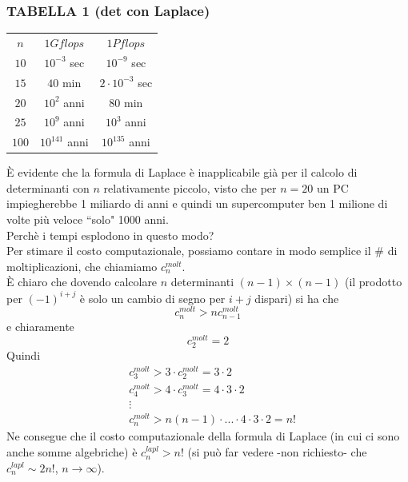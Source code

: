 \documentclass[12pt,a4paper]{article}
\begin{document}
\subsubsection{TABELLA 1 (det con Laplace)}
\begin{table}[H]
    \centering
    \begin{tabular}{ccc}
        $n$ & $1 Gflops$ & $1 Pflops$  \\  \cline{1-3}
        $10$ & $10^{-3}$ sec & $10^{-9}$ sec \\
        $15$ & $40$ min & $2\cdot10^{-3}$ sec \\
	    $20$ & $10^{2}$ anni & $80$ min \\
    	$25$ & $10^{9}$ anni & $10^{3}$ anni \\
    	$100$ & $10^{141}$ anni & $10^{135}$ anni\\ 
    \end{tabular}
\end{table}
È evidente che la formula di Laplace è inapplicabile già per il calcolo di determinanti con $n$ relativamente piccolo, visto che per $n=20$ un PC impiegherebbe 1 miliardo di anni e quindi un supercomputer ben 1 milione di volte più veloce ``solo" 1000 anni.\\Perchè i tempi esplodono in questo modo?\\Per stimare il costo computazionale, possiamo contare in modo semplice il \# di moltiplicazioni, che chiamiamo $c_n^{molt}$.\\
È chiaro che dovendo calcolare $n$ determinanti $(n-1)\times (n-1)$ (il prodotto per $(-1)^{i+j}$ è solo un cambio di segno per $i+j$ dispari) si ha che 
\begin{equation*}
    c_n^{molt} > n c_{n-1}^{molt}
\end{equation*}
e chiaramente
\begin{equation*}
    c_2^{molt} = 2
\end{equation*}
Quindi
\begin{equation*}
    \begin{split}
        & c_3^{molt} > 3 \cdot c_2^{molt} = 3\cdot 2 \\
        & c_4^{molt} > 4 \cdot c_3^{molt} = 4\cdot 3\cdot 2 \\
        & \vdots \\
        & c_n^{molt} > n(n-1)\cdot ... \cdot 4\cdot 3\cdot 2 = n!
    \end{split}
\end{equation*}
Ne consegue che il costo computazionale della formula di Laplace (in cui ci sono anche somme algebriche) è $c_n^{lapl} > n!$ (si può far vedere -non richiesto- che $c_n^{lapl} \sim 2n!$, $n \to \infty$). \\
\end{document}
